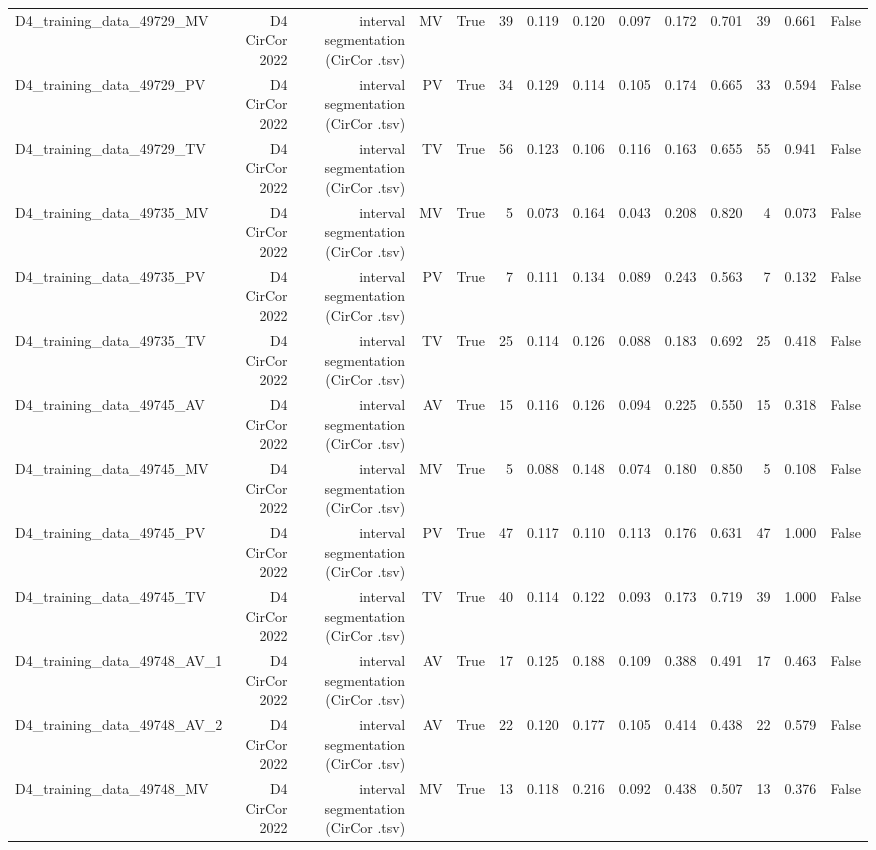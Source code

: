 \begin{table}[htbp]
\begin{tabular}{lrrrrrrrrrrrrr}
    D4\_training\_data\_49729\_MV & D4 CirCor 2022 & interval segmentation (CirCor .tsv) & MV & True & 39 & 0.119 & 0.120 & 0.097 & 0.172 & 0.701 & 39 & 0.661 & False \\
    D4\_training\_data\_49729\_PV & D4 CirCor 2022 & interval segmentation (CirCor .tsv) & PV & True & 34 & 0.129 & 0.114 & 0.105 & 0.174 & 0.665 & 33 & 0.594 & False \\
    D4\_training\_data\_49729\_TV & D4 CirCor 2022 & interval segmentation (CirCor .tsv) & TV & True & 56 & 0.123 & 0.106 & 0.116 & 0.163 & 0.655 & 55 & 0.941 & False \\
    D4\_training\_data\_49735\_MV & D4 CirCor 2022 & interval segmentation (CirCor .tsv) & MV & True & 5 & 0.073 & 0.164 & 0.043 & 0.208 & 0.820 & 4 & 0.073 & False \\
    D4\_training\_data\_49735\_PV & D4 CirCor 2022 & interval segmentation (CirCor .tsv) & PV & True & 7 & 0.111 & 0.134 & 0.089 & 0.243 & 0.563 & 7 & 0.132 & False \\
    D4\_training\_data\_49735\_TV & D4 CirCor 2022 & interval segmentation (CirCor .tsv) & TV & True & 25 & 0.114 & 0.126 & 0.088 & 0.183 & 0.692 & 25 & 0.418 & False \\
    D4\_training\_data\_49745\_AV & D4 CirCor 2022 & interval segmentation (CirCor .tsv) & AV & True & 15 & 0.116 & 0.126 & 0.094 & 0.225 & 0.550 & 15 & 0.318 & False \\
    D4\_training\_data\_49745\_MV & D4 CirCor 2022 & interval segmentation (CirCor .tsv) & MV & True & 5 & 0.088 & 0.148 & 0.074 & 0.180 & 0.850 & 5 & 0.108 & False \\
    D4\_training\_data\_49745\_PV & D4 CirCor 2022 & interval segmentation (CirCor .tsv) & PV & True & 47 & 0.117 & 0.110 & 0.113 & 0.176 & 0.631 & 47 & 1.000 & False \\
    D4\_training\_data\_49745\_TV & D4 CirCor 2022 & interval segmentation (CirCor .tsv) & TV & True & 40 & 0.114 & 0.122 & 0.093 & 0.173 & 0.719 & 39 & 1.000 & False \\
    D4\_training\_data\_49748\_AV\_1 & D4 CirCor 2022 & interval segmentation (CirCor .tsv) & AV & True & 17 & 0.125 & 0.188 & 0.109 & 0.388 & 0.491 & 17 & 0.463 & False \\
    D4\_training\_data\_49748\_AV\_2 & D4 CirCor 2022 & interval segmentation (CirCor .tsv) & AV & True & 22 & 0.120 & 0.177 & 0.105 & 0.414 & 0.438 & 22 & 0.579 & False \\
    D4\_training\_data\_49748\_MV & D4 CirCor 2022 & interval segmentation (CirCor .tsv) & MV & True & 13 & 0.118 & 0.216 & 0.092 & 0.438 & 0.507 & 13 & 0.376 & False \\

\end{tabular}
\end{table}
